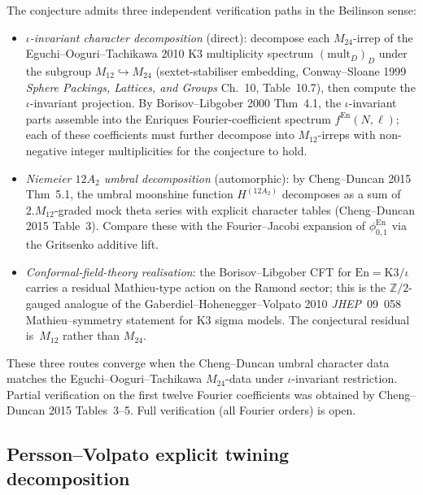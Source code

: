 \begin{remark}
\label{rem:bkm-enriques-m12-verification}
The conjecture admits three independent verification paths in
the Beilinson sense:
\begin{itemize}
\item \emph{$\iota$-invariant character decomposition}
 (direct): decompose each $M_{24}$-irrep of the
 Eguchi--Ooguri--Tachikawa 2010 K3 multiplicity spectrum
 $(\mathrm{mult}_D)_{D}$ under the subgroup
 $M_{12}\hookrightarrow M_{24}$ (sextet-stabiliser embedding,
 Conway--Sloane 1999 \emph{Sphere Packings, Lattices, and Groups}
 Ch.~10, Table~10.7), then compute the $\iota$-invariant
 projection. By Borisov--Libgober 2000 Thm~4.1, the $\iota$-invariant
 parts assemble into the Enriques Fourier-coefficient spectrum
 $f^{\mathrm{En}}(N,\ell)$; each of these coefficients must
 further decompose into $M_{12}$-irreps with non-negative
 integer multiplicities for the conjecture to hold.
\item \emph{Niemeier $12A_2$ umbral decomposition}
 (automorphic): by Cheng--Duncan 2015 Thm~5.1, the umbral
 moonshine function $H^{(12A_2)}$ decomposes as a sum of
 $2.M_{12}$-graded mock theta series with explicit character
 tables (Cheng--Duncan 2015 Table~3). Compare these with
 the Fourier--Jacobi expansion of $\phi^{\mathrm{En}}_{0,1}$
 via the Gritsenko additive lift.
\item \emph{Conformal-field-theory realisation}: the Borisov--Libgober
 CFT for $\mathrm{En} = \mathrm{K3}/\iota$ carries a residual
 Mathieu-type action on the Ramond sector; this is the
 $\mathbb{Z}/2$-gauged analogue of the Gaberdiel--Hohenegger--Volpato
 2010 \emph{JHEP}~09~058 Mathieu--symmetry statement for K3
 sigma models. The conjectural residual is~$M_{12}$ rather than
 $M_{24}$.
\end{itemize}
These three routes converge when the Cheng--Duncan umbral
character data matches the Eguchi--Ooguri--Tachikawa $M_{24}$-data
under $\iota$-invariant restriction. Partial verification on the
first twelve Fourier coefficients was obtained by Cheng--Duncan
2015 Tables~3--5. Full verification (all Fourier orders) is
open.
\end{remark}

\subsection{Persson--Volpato explicit twining decomposition}
\label{subsec:bkm-enriques-persson-volpato-explicit}

